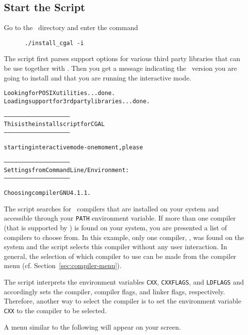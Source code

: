 \subsection{Start the Script}

Go to the \cgaldir\ directory and enter the command
\begin{verbatim}
      ./install_cgal -i
\end{verbatim}

The script first parses support options for various third party
libraries that can be use together with \cgal. Then you get a message
indicating the \cgal\ version you are going to install and that you
are running the interactive mode.

{\ccTexHtml{\scriptsize}{}
\begin{alltt}
Looking for POSIX utilities... done.
Loading support for 3rd party libraries...done.

--------------------------------------------------------
  This is the install script for CGAL \cgalrelease
--------------------------------------------------------

starting interactive mode - one moment, please

--------------------------------------------------------
Settings from Command Line/Environment:
--------------------------------------------------------

  Choosing compiler GNU 4.1.1.
\end{alltt}}

The script searches for \CC\ compilers that are installed on your
system and accessible through your \texttt{PATH} environment variable.
If more than one compiler (that is supported by \cgal) is found on
your system, you are presented a list of compilers to choose from. In
this example, only one compiler, , was found on the system
and the script selects this compiler without any user interaction. In
general, the selection of which compiler to use can be made from the
compiler menu (cf. Section~\ref{sec:compiler-menu}).

The script interprets the environment variables \texttt{CXX},
\texttt{CXXFLAGS}, and \texttt{LDFLAGS} and accordingly sets the
compiler, compiler flags, and linker flags, respectively.  Therefore,
another way to select the compiler is to set the environment variable
\texttt{CXX} to the compiler to be selected.

A menu similar to the following will appear on your screen.

